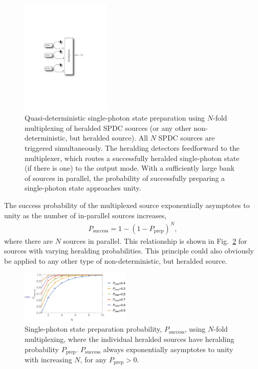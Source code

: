 \begin{figure}[htpb]
\includegraphics[width=0.38\textwidth]{SPDC_multiplexing_arch}
\caption{Quasi-deterministic single-photon state preparation using $N$-fold multiplexing of heralded SPDC sources (or any other non-deterministic, but heralded source). All $N$ SPDC sources are triggered simultaneously. The heralding detectors feedforward to the multiplexer, which routes a successfully heralded single-photon state (if there is one) to the output mode. With a sufficiently large bank of sources in parallel, the probability of successfully preparing a single-photon state approaches unity.} \label{fig:SPDC_multiplexing_arch}
\end{figure}

The success probability of the multiplexed source exponentially asymptotes to unity as the number of in-parallel sources increases,
\begin{align} \label{eq:SPDC_multiplex}
P_\mathrm{success} = 1 - (1-P_\mathrm{prep})^N,
\end{align}
where there are $N$ sources in parallel. This relationship is shown in Fig.~\ref{fig:SPDC_multiplexing_plot} for sources with varying heralding probabilities. This principle could also obviously be applied to any other type of non-deterministic, but heralded source.

\begin{figure}[htpb]
\includegraphics[width=0.47\textwidth]{SPDC_multiplexing_plot}
\caption{Single-photon state preparation probability, $P_\mathrm{success}$, using $N$-fold multiplexing, where the individual heralded sources have heralding probability $P_\mathrm{prep}$. $P_\mathrm{success}$ always exponentially asymptotes to unity with increasing $N$, for any \mbox{$P_\mathrm{prep}>0$}.} \label{fig:SPDC_multiplexing_plot}
\end{figure}


